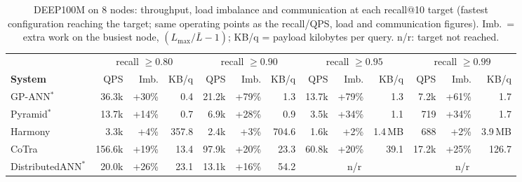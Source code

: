 \begin{table}[t]
\centering
\small
\setlength{\tabcolsep}{4pt}
\caption{DEEP100M on 8 nodes: throughput, load imbalance and communication at each recall@10 target (fastest configuration reaching the target; same operating points as the recall/QPS, load and communication figures). Imb.\ = extra work on the busiest node, $(L_{\max}/\bar{L}-1)$; KB/q = payload kilobytes per query. n/r: target not reached.}
\label{tab:summary-deep100m}
\begin{tabular}{lrrrrrrrrrrrr}
\toprule
 & \multicolumn{3}{c}{recall $\geq 0.80$} & \multicolumn{3}{c}{recall $\geq 0.90$} & \multicolumn{3}{c}{recall $\geq 0.95$} & \multicolumn{3}{c}{recall $\geq 0.99$} \\
\cmidrule(lr){2-4}\cmidrule(lr){5-7}\cmidrule(lr){8-10}\cmidrule(lr){11-13}
\textbf{System} & QPS & Imb. & KB/q & QPS & Imb. & KB/q & QPS & Imb. & KB/q & QPS & Imb. & KB/q \\
\midrule
GP-ANN$^*$ & 36.3k & +30\% & 0.4 & 21.2k & +79\% & 1.3 & 13.7k & +79\% & 1.3 & 7.2k & +61\% & 1.7 \\
Pyramid$^*$ & 13.7k & +14\% & 0.7 & 6.9k & +28\% & 0.9 & 3.5k & +34\% & 1.1 & 719 & +34\% & 1.7 \\
Harmony & 3.3k & +4\% & 357.8 & 2.4k & +3\% & 704.6 & 1.6k & +2\% & 1.4\,MB & 688 & +2\% & 3.9\,MB \\
CoTra & 156.6k & +19\% & 13.4 & 97.9k & +20\% & 23.3 & 60.8k & +20\% & 39.1 & 17.2k & +25\% & 126.7 \\
DistributedANN$^*$ & 20.0k & +26\% & 23.1 & 13.1k & +16\% & 54.2 & \multicolumn{3}{c}{n/r} & \multicolumn{3}{c}{n/r} \\
\bottomrule
\end{tabular}
\end{table}
